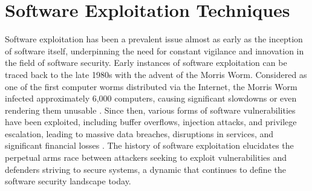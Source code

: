 \documentclass{article}
\begin{document}

\section{Software Exploitation Techniques}%
Software exploitation has been a prevalent issue almost as early as the
inception of software itself, underpinning the need for constant vigilance and
innovation in the field of software security. Early instances of software
exploitation can be traced back to the late 1980s with the advent of the Morris
Worm. Considered as one of the first computer worms distributed via the
Internet, the Morris Worm infected approximately 6,000 computers, causing
significant slowdowns or even rendering them unusable
\cite{spafford1989internet}. Since then, various forms of software
vulnerabilities have been exploited, including buffer overflows, injection
attacks, and privilege escalation, leading to massive data breaches, disruptions
in services, and significant financial losses \cite{owasp2017}. The history of
software exploitation elucidates the perpetual arms race between attackers
seeking to exploit vulnerabilities and defenders striving to secure systems, a
dynamic that continues to define the software security landscape today.
\end{document}
